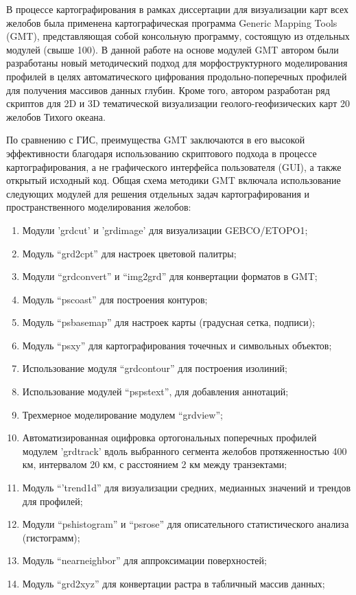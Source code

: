 В процессе картографирования в рамках диссертации для визуализации карт всех желобов была применена картографическая программа Generic Mapping Tools (GMT), представляющая собой консольную программу, состоящую из отдельных модулей (свыше 100). В данной работе на основе модулей GMT автором были разработаны новый методический подход для морфоструктурного моделирования профилей в целях автоматического цифрования продольно-поперечных профилей для получения массивов данных глубин. Кроме того, автором разработан ряд скриптов для 2D и 3D тематической визуализации геолого-геофизических карт 20 желобов Тихого океана. 

По сравнению с ГИС, преимущества GMT заключаются в его высокой эффективности благодаря использованию скриптового подхода в процессе картографирования, а не графического интерфейса пользователя (GUI), а также открытый исходный код. Общая схема методики GMT включала использование следующих модулей для решения отдельных задач картографирования и пространственного моделирования желобов: 
\begin{enumerate}
	\item Модули 'grdcut' и 'grdimage' для визуализации GEBCO/ETOPO1; 
	\item Модуль “grd2cpt” для настроек цветовой палитры;
	\item Модули “grdconvert” и “img2grd” для конвертации форматов в GMT;
	\item Модуль “pscoast” для построения контуров;
	\item Модуль “psbasemap” для настроек карты (градусная сетка, подписи);
	\item Модуль “psxy” для картографирования точечных и символьных объектов;
	\item Использование модуля  “grdcontour” для построения изолиний;
	\item Использование модулей “pspstext”, для добавления аннотаций; 
	\item Трехмерное моделирование модулем “grdview”;
	\item Автоматизированная оцифровка ортогональных поперечных профилей модулем ’grdtrack’ вдоль выбранного сегмента желобов протяженностью 400 км, интервалом 20 км, с расстоянием 2 км между транзектами; 
	\item Модуль “'trend1d” для визуализации средних, медианных значений и трендов для профилей;
	\item Модули “pshistogram” и “psrose” для описательного статистического анализа (гистограмм);
	\item Модуль “nearneighbor” для аппроксимации поверхностей;
	\item Модуль “grd2xyz” для конвертации растра в табличный массив данных;
\end{enumerate}

